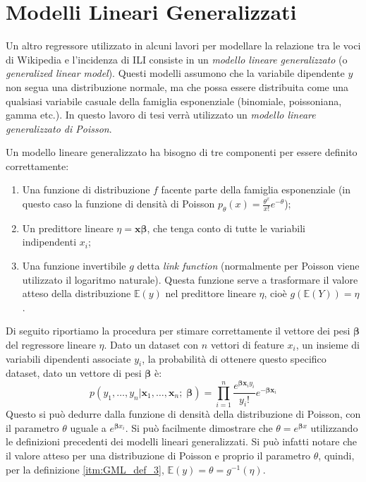 \section{Modelli Lineari Generalizzati}
\bigskip

Un altro regressore utilizzato in alcuni lavori \cite{McIver2014} per modellare la relazione tra le voci di Wikipedia e l'incidenza di ILI consiste 
in un \textit{modello lineare generalizzato}\cite{GLM} (o \textit{generalized linear model}). Questi modelli assumono che la variabile 
dipendente $y$ non segua una distribuzione normale, ma che possa essere distribuita come una qualsiasi variabile casuale 
della famiglia esponenziale (binomiale, poissoniana, gamma etc.). In questo lavoro di tesi verrà utilizzato un 
\textit{modello lineare generalizzato di Poisson}. 
\bigskip
 
Un modello lineare generalizzato ha bisogno di tre componenti per essere definito correttamente:
\begin{enumerate}
\item Una funzione di distribuzione $f$ facente parte della famiglia esponenziale (in questo caso la funzione di densità di Poisson $p_{\theta}(x) = \frac{\theta^{x}}{x!}e^{-\theta}$);
\item Un predittore lineare $\eta = \bm{x\beta}$, che tenga conto di tutte le variabili indipendenti $x_i$;
\item Una funzione invertibile $g$ detta \textit{link function} (normalmente per Poisson viene utilizzato il logaritmo naturale). Questa funzione serve a trasformare il valore atteso della distribuzione $\mathbb{E}(y)$ nel predittore lineare $\eta$, cioè $g(\mathbb{E}(Y)) = \eta$ \label{itm:GML_def_3}.
\end{enumerate}

Di seguito riportiamo la procedura per stimare correttamente il vettore dei pesi $\bm{\beta}$ del regressore lineare $\eta$. 
Dato un dataset con $n$ vettori di feature $x_i$, un insieme di variabili dipendenti 
associate $y_i$, la probabilità di ottenere questo specifico dataset, dato un vettore di pesi $\bm{\beta}$ è:
\begin{equation}
p(y_1,\ldots,y_n | \bm{x}_1,\ldots,\bm{x}_n; \; \bm{\beta}) = \prod_{i=1}^n \frac{e^{\bm{\beta}\bm{x}_iy_i}}{y_i!}e^{-\bm{\beta}\bm{x}_i} \label{eq:GLM_Poisson}
\end{equation}
Questo si può dedurre dalla funzione di densità della distribuzione di Poisson, con il parametro $\theta$ uguale a $e^{\bm{\beta}x_i}$. Si può facilmente dimostrare che $\theta=e^{\bm{\beta}x}$ utilizzando le definizioni precedenti dei modelli lineari generalizzati. Si può infatti notare che il valore atteso per una distribuzione di Poisson e proprio il parametro $\theta$, quindi, per la definizione \ref{itm:GML_def_3}, $\mathbb{E}(y) = \theta = g^{-1}(\eta)$.
\bigskip


